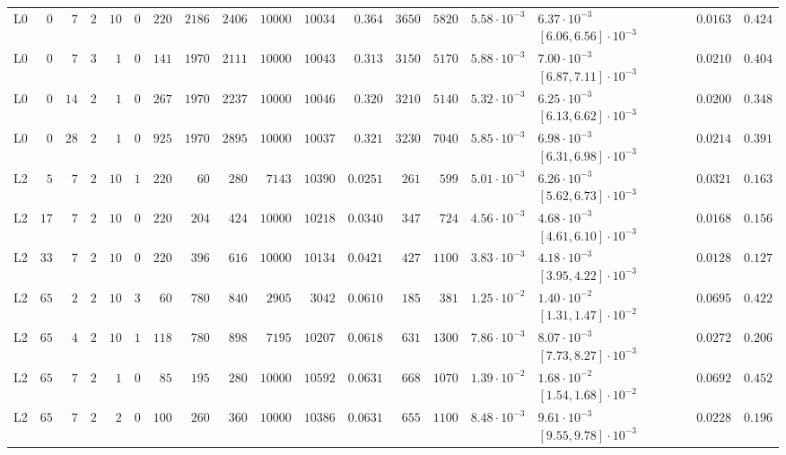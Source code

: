 \begin{table}[!htbp]
{\begin{tabular}{@{}lrrrrrrrrrrrrrrlrr@{}}
L0 & $0$ & $7$ & $2$ & $10$ & $0$ & $220$ & $2186$ & $2406$ & $10000$ & $10034$ & $0.364$ & $3650$ & $5820$ & $5.58\cdot 10^{-3}$ & $6.37\cdot 10^{-3}$ $[6.06, 6.56]\cdot 10^{-3}$ & $0.0163$ & $0.424$ \\
L0 & $0$ & $7$ & $3$ & $1$ & $0$ & $141$ & $1970$ & $2111$ & $10000$ & $10043$ & $0.313$ & $3150$ & $5170$ & $5.88\cdot 10^{-3}$ & $7.00\cdot 10^{-3}$ $[6.87, 7.11]\cdot 10^{-3}$ & $0.0210$ & $0.404$ \\
L0 & $0$ & $14$ & $2$ & $1$ & $0$ & $267$ & $1970$ & $2237$ & $10000$ & $10046$ & $0.320$ & $3210$ & $5140$ & $5.32\cdot 10^{-3}$ & $6.25\cdot 10^{-3}$ $[6.13, 6.62]\cdot 10^{-3}$ & $0.0200$ & $0.348$ \\
L0 & $0$ & $28$ & $2$ & $1$ & $0$ & $925$ & $1970$ & $2895$ & $10000$ & $10037$ & $0.321$ & $3230$ & $7040$ & $5.85\cdot 10^{-3}$ & $6.98\cdot 10^{-3}$ $[6.31, 6.98]\cdot 10^{-3}$ & $0.0214$ & $0.391$ \\
\midrule
L2 & $5$ & $7$ & $2$ & $10$ & $1$ & $220$ & $60$ & $280$ & $7143$ & $10390$ & $0.0251$ & $261$ & $599$ & $5.01\cdot 10^{-3}$ & $6.26\cdot 10^{-3}$ $[5.62, 6.73]\cdot 10^{-3}$ & $0.0321$ & $0.163$ \\
L2 & $17$ & $7$ & $2$ & $10$ & $0$ & $220$ & $204$ & $424$ & $10000$ & $10218$ & $0.0340$ & $347$ & $724$ & $4.56\cdot 10^{-3}$ & $4.68\cdot 10^{-3}$ $[4.61, 6.10]\cdot 10^{-3}$ & $0.0168$ & $0.156$ \\
L2 & $33$ & $7$ & $2$ & $10$ & $0$ & $220$ & $396$ & $616$ & $10000$ & $10134$ & $0.0421$ & $427$ & $1100$ & $3.83\cdot 10^{-3}$ & $4.18\cdot 10^{-3}$ $[3.95, 4.22]\cdot 10^{-3}$ & $0.0128$ & $0.127$ \\
L2 & $65$ & $2$ & $2$ & $10$ & $3$ & $60$ & $780$ & $840$ & $2905$ & $3042$ & $0.0610$ & $185$ & $381$ & $1.25\cdot 10^{-2}$ & $1.40\cdot 10^{-2}$ $[1.31, 1.47]\cdot 10^{-2}$ & $0.0695$ & $0.422$ \\
L2 & $65$ & $4$ & $2$ & $10$ & $1$ & $118$ & $780$ & $898$ & $7195$ & $10207$ & $0.0618$ & $631$ & $1300$ & $7.86\cdot 10^{-3}$ & $8.07\cdot 10^{-3}$ $[7.73, 8.27]\cdot 10^{-3}$ & $0.0272$ & $0.206$ \\
L2 & $65$ & $7$ & $2$ & $1$ & $0$ & $85$ & $195$ & $280$ & $10000$ & $10592$ & $0.0631$ & $668$ & $1070$ & $1.39\cdot 10^{-2}$ & $1.68\cdot 10^{-2}$ $[1.54, 1.68]\cdot 10^{-2}$ & $0.0692$ & $0.452$ \\
L2 & $65$ & $7$ & $2$ & $2$ & $0$ & $100$ & $260$ & $360$ & $10000$ & $10386$ & $0.0631$ & $655$ & $1100$ & $8.48\cdot 10^{-3}$ & $9.61\cdot 10^{-3}$ $[9.55, 9.78]\cdot 10^{-3}$ & $0.0228$ & $0.196$ \\

\end{tabular}}
\end{table}
